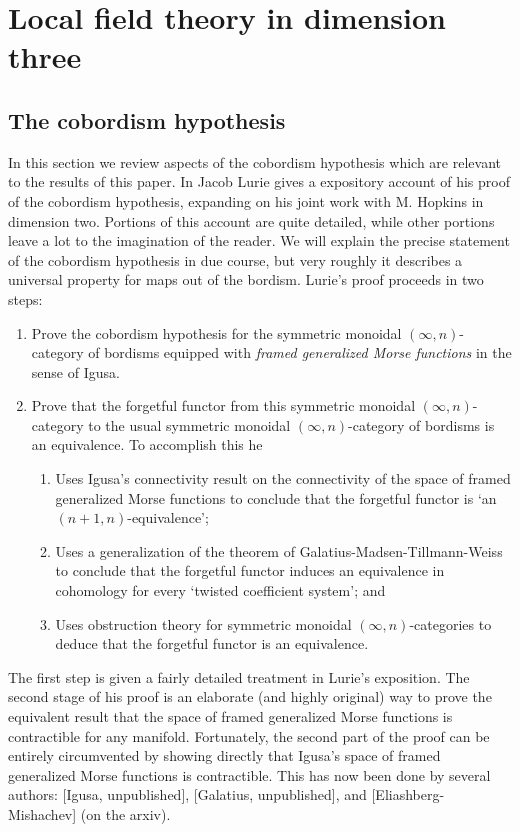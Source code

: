 \documentclass{amsart}
\begin{document}
\section{Local field theory in dimension three} \label{sec-lft}

\subsection{The cobordism hypothesis}

In this section we review aspects of the cobordism hypothesis which are relevant to the results of this paper. In \cite{Lurie???}     Jacob Lurie gives a expository account of his proof of the cobordism hypothesis, expanding on his joint work with M. Hopkins in dimension two. Portions of this account are quite detailed, while other portions leave a lot to the imagination of the reader. We will explain the precise statement of the cobordism hypothesis in due course, but very roughly it describes a universal property for maps out of the bordism. Lurie's proof proceeds in two steps:
\begin{enumerate}
	\item Prove the cobordism hypothesis for the symmetric monoidal $(\infty,n)$-category of bordisms equipped with {\em framed generalized Morse functions} in the sense of Igusa.
	\item Prove that the forgetful functor from this symmetric monoidal $(\infty,n)$-category to the usual symmetric monoidal $(\infty,n)$-category of bordisms is an equivalence. To accomplish this he
	\begin{enumerate}
		\item Uses Igusa's connectivity result on the connectivity of the space of framed generalized Morse functions to conclude that the forgetful functor is `an $(n+1, n)$-equivalence';
		\item Uses a generalization of the theorem of Galatius-Madsen-Tillmann-Weiss to conclude that the forgetful functor induces an equivalence in cohomology for every `twisted coefficient system'; and 
		\item Uses obstruction theory for symmetric monoidal $(\infty,n)$-categories to deduce that the forgetful functor is an equivalence. 
	\end{enumerate}
\end{enumerate}
The first step is given a fairly detailed treatment in Lurie's exposition.
The second stage of his proof is an elaborate (and highly original) way to prove the equivalent result that the space of framed generalized Morse functions is contractible for any manifold. Fortunately, the second part of the proof can be entirely circumvented by showing directly that Igusa's space of framed generalized Morse functions is contractible. This has now been done by several authors: [Igusa, unpublished], [Galatius, unpublished], and [Eliashberg-Mishachev] (on the arxiv).  
\end{document}
